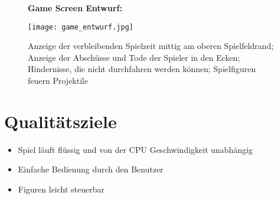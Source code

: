 \begin{figure}[H]
\textbf{Game Screen Entwurf:}\par\medskip
\centering
\texttt{[image: game\_entwurf.jpg]}
\caption{Anzeige der verbleibenden Spielzeit mittig am oberen Spielfeldrand; Anzeige der Abschüsse und Tode der Spieler in den Ecken; Hindernisse, die nicht durchfahren werden können; Spielfiguren feuern Projektile}	
\end{figure}


\section{Qualitätsziele}
\begin{itemize}
\item Spiel läuft flüssig und von der CPU Geschwindigkeit unabhängig
\item Einfache Bedienung durch den Benutzer
\item Figuren leicht steuerbar
\end{itemize}